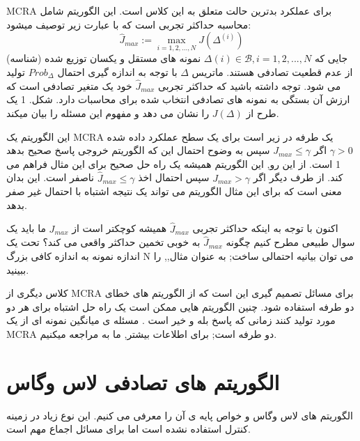 \documentclass[12pt]{article} %
\begin{document}
   MCRA برای عملکرد بدترین حالت متعلق به
   این کلاس است. این الگوریتم شامل محاسبه
   حداکثر تجربی است که با عبارت زیر توصیف میشود:
   \begin{equation*} 	
	   \hat{J}_{max}:= \max_{i=1, 2, ..., N}J(\Delta ^{(i)}) 
   \end{equation*}
   جایی که
   $\Delta (i) \in \mathscr{B} , i=1,2,...,N$
   نمونه های مستقل و یکسان توزیع شده (شناسه) از عدم قطعیت تصادفی هستند.
   ماتریس
   $\Delta$
   با توجه به اندازه گیری احتمال
   $Prob_{\Delta }$
   تولید می شود.
   توجه داشته باشید که حداکثر تجربی
   $\hat{J}_{max}$ 
   خود یک
   متغیر تصادفی است که ارزش آن بستگی به نمونه های تصادفی انتخاب شده
	برای محاسبات دارد.
	شکل. 1 یک طرح از
	$J(\Delta)$
	را نشان می دهد
   و مفهوم این مسئله را بیان میکند.
   \par
   این الگوریتم یک MCRA یک طرفه در زیر است
   برای یک سطح عملکرد داده شده
   $\gamma > 0$
   اگر
   $J_{max}\leq \gamma $
   سپس به وضوح احتمال این که الگوریتم خروجی
   پاسخ صحیح بدهد 1 است.
   از این رو, این الگوریتم همیشه یک راه حل صحیح برای این مثال فراهم می کند.
   از طرف دیگر اگر
   $J_{max}>\gamma $
   سپس احتمال اخذ
   $\hat{J}_{max}\leq\gamma $
   ناصفر است.
   این بدان معنی است که برای این مثال الگوریتم
   می تواند یک نتیجه اشتباه با احتمال غیر صفر بدهد.\par
   اکنون با توجه به اینکه حداکثر تجربی
   $\hat{J}_{max}$
   همیشه کوچکتر است از
   $J_{max}$
   ما باید یک سوال طبیعی مطرح کنیم
   چگونه
   $\hat{J}_{max}$
   به خوبی تخمین حداکثر واقعی می کند؟
   تحت یک
	اندازه نمونه به اندازه کافی بزرگ
   N
   می توان بیانیه احتمالی
   ساخت; به عنوان مثال,\cite{bib22}, \cite{bib23} را ببینید.
   \par   
   کلاس دیگری از MCRA برای مسائل تصمیم گیری این است که از
   الگوریتم های خطای دو طرفه استفاده شود.
   چنین الگوریتم هایی ممکن است یک راه حل اشتباه برای هر دو مورد تولید کنند زمانی که پاسخ بله و خیر است \cite{bib17}.
   مسئله ی میانگین  نمونه ای از یک MCRA  دو طرفه است; برای اطلاعات بیشتر, ما به  \cite{bib24} مراجعه میکنیم.

   \section{الگوریتم های تصادفی لاس وگاس}
   الگوریتم های لاس وگاس و خواص پایه ی آن را معرفی می کنیم.
   این نوع زیاد در زمینه کنترل استفاده نشده است اما برای مسائل اجماع مهم است. 
   
\end{document}
